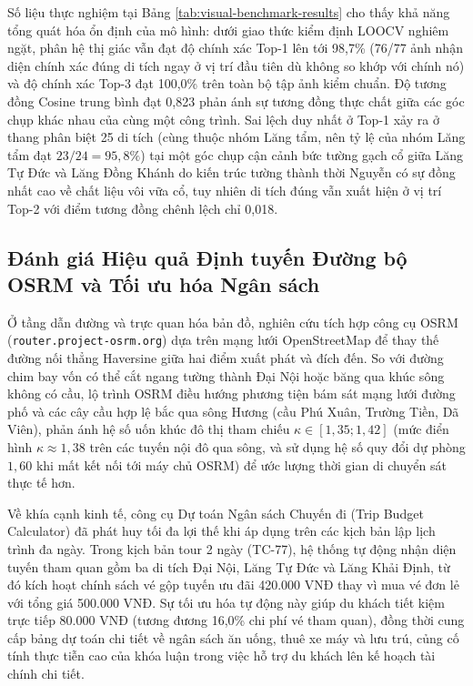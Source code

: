 Số liệu thực nghiệm tại Bảng \ref{tab:visual-benchmark-results} cho thấy khả năng tổng quát hóa ổn định của mô hình: dưới giao thức kiểm định LOOCV nghiêm ngặt, phân hệ thị giác vẫn đạt độ chính xác Top-1 lên tới 98,7\% (76/77 ảnh nhận diện chính xác đúng di tích ngay ở vị trí đầu tiên dù không so khớp với chính nó) và độ chính xác Top-3 đạt 100,0\% trên toàn bộ tập ảnh kiểm chuẩn. Độ tương đồng Cosine trung bình đạt 0,823 phản ánh sự tương đồng thực chất giữa các góc chụp khác nhau của cùng một công trình. Sai lệch duy nhất ở Top-1 xảy ra ở thang phân biệt 25 di tích (cùng thuộc nhóm Lăng tẩm, nên tỷ lệ của nhóm Lăng tẩm đạt $23/24 = 95{,}8\%$) tại một góc chụp cận cảnh bức tường gạch cổ giữa Lăng Tự Đức và Lăng Đồng Khánh do kiến trúc tường thành thời Nguyễn có sự đồng nhất cao về chất liệu vôi vữa cổ, tuy nhiên di tích đúng vẫn xuất hiện ở vị trí Top-2 với điểm tương đồng chênh lệch chỉ 0,018.

\subsection{Đánh giá Hiệu quả Định tuyến Đường bộ OSRM và Tối ưu hóa Ngân sách}
\label{subsec:ch2-budget-osrm-evaluation}

Ở tầng dẫn đường và trực quan hóa bản đồ, nghiên cứu tích hợp công cụ OSRM (\texttt{router.project-osrm.org}) dựa trên mạng lưới OpenStreetMap để thay thế đường nối thẳng Haversine giữa hai điểm xuất phát và đích đến. So với đường chim bay vốn có thể cắt ngang tường thành Đại Nội hoặc băng qua khúc sông không có cầu, lộ trình OSRM điều hướng phương tiện bám sát mạng lưới đường phố và các cây cầu hợp lệ bắc qua sông Hương (cầu Phú Xuân, Trường Tiền, Dã Viên), phản ánh hệ số uốn khúc đô thị tham chiếu $\kappa \in [1{,}35; 1{,}42]$ (mức điển hình $\kappa \approx 1{,}38$ trên các tuyến nội đô qua sông, và sử dụng hệ số quy đổi dự phòng $1{,}60$ khi mất kết nối tới máy chủ OSRM) để ước lượng thời gian di chuyển sát thực tế hơn.

Về khía cạnh kinh tế, công cụ Dự toán Ngân sách Chuyến đi (Trip Budget Calculator) đã phát huy tối đa lợi thế khi áp dụng trên các kịch bản lập lịch trình đa ngày. Trong kịch bản tour 2 ngày (TC-77), hệ thống tự động nhận diện tuyến tham quan gồm ba di tích Đại Nội, Lăng Tự Đức và Lăng Khải Định, từ đó kích hoạt chính sách vé gộp tuyến ưu đãi 420.000 VNĐ thay vì mua vé đơn lẻ với tổng giá 500.000 VNĐ. Sự tối ưu hóa tự động này giúp du khách tiết kiệm trực tiếp 80.000 VNĐ (tương đương 16,0\% chi phí vé tham quan), đồng thời cung cấp bảng dự toán chi tiết về ngân sách ăn uống, thuê xe máy và lưu trú, củng cố tính thực tiễn cao của khóa luận trong việc hỗ trợ du khách lên kế hoạch tài chính chi tiết.

